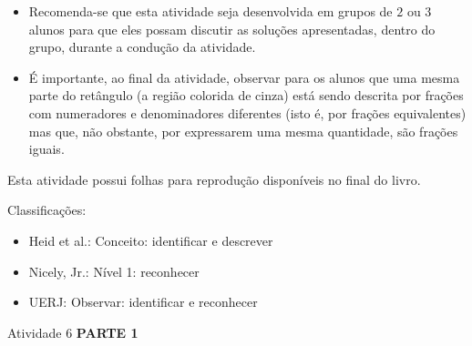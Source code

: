 \begin{multicols}{2}
  
 
\begin{itemize} %
    \item       Recomenda-se que esta atividade seja desenvolvida em grupos de   
    $2$       ou       $3$       alunos para que eles possam discutir as 
soluções apresentadas, dentro do grupo, durante a condução da atividade.
    \item       É importante, ao final da atividade, observar para os alunos que 
uma mesma parte do retângulo (a região colorida de cinza) está sendo descrita 
por frações com numeradores e denominadores diferentes (isto é, por frações 
equivalentes) mas que, não obstante, por expressarem uma mesma quantidade, são 
frações iguais. 
\end{itemize} %
  
  
  Esta atividade possui     folhas para reprodução disponíveis no final do 
livro.
  
  Classificações:  
\begin{itemize} %
    \item       Heid et al.: Conceito: identificar e descrever
    \item       Nicely, Jr.: Nível 1: reconhecer
    \item       UERJ: Observar: identificar e reconhecer
\end{itemize} %

\begin{resposta*}{Atividade 6}
  {\bf PARTE 1}  



\end{resposta*}
\end{multicols}

